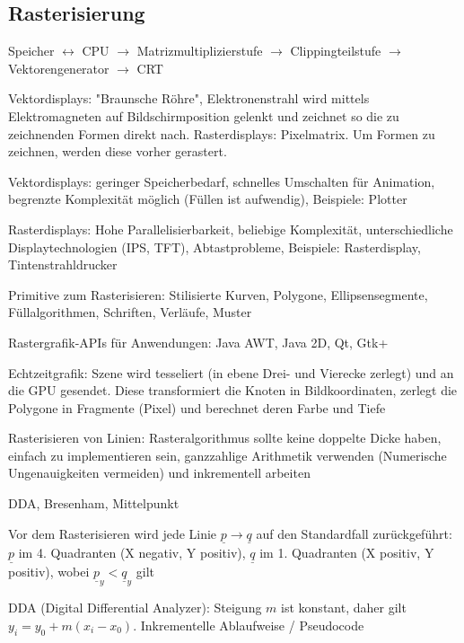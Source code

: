 \documentclass[12pt,landscape]{article}
\begin{document}
\begin{multicols}{3}
\section{Rasterisierung}
\begin{compactitem}
\item Speicher $\leftrightarrow$ CPU $\rightarrow$ Matrizmultiplizierstufe $\rightarrow$ Clippingteilstufe $\rightarrow$ Vektorengenerator $\rightarrow$ CRT
\item Vektordisplays: "Braunsche Röhre", Elektronenstrahl wird mittels Elektromagneten auf Bildschirmposition gelenkt und zeichnet so die zu zeichnenden Formen direkt nach. Rasterdisplays: Pixelmatrix. Um Formen zu zeichnen, werden diese vorher gerastert.
\item Vektordisplays: geringer Speicherbedarf, schnelles Umschalten für Animation, begrenzte Komplexität möglich (Füllen ist aufwendig), Beispiele: Plotter
\item Rasterdisplays: Hohe Parallelisierbarkeit, beliebige Komplexität, unterschiedliche Displaytechnologien (IPS, TFT), Abtastprobleme, Beispiele: Rasterdisplay, Tintenstrahldrucker
\item Primitive zum Rasterisieren: Stilisierte Kurven, Polygone, Ellipsensegmente, Füllalgorithmen, Schriften, Verläufe, Muster 
\item Rastergrafik-APIs für Anwendungen: Java AWT, Java 2D, Qt, Gtk+
\item Echtzeitgrafik: Szene wird tesseliert (in ebene Drei- und Vierecke zerlegt) und an die GPU gesendet. Diese transformiert die Knoten in Bildkoordinaten, zerlegt die Polygone in Fragmente (Pixel) und berechnet deren Farbe und Tiefe
\item Rasterisieren von Linien: Rasteralgorithmus sollte keine doppelte Dicke haben, einfach zu implementieren sein, ganzzahlige Arithmetik verwenden (Numerische Ungenauigkeiten vermeiden) und inkrementell arbeiten
\item DDA, Bresenham, Mittelpunkt
\item Vor dem Rasterisieren wird jede Linie $\underline{p} \rightarrow \underline{q}$ auf den Standardfall zurückgeführt: $\underline{p}$ im 4. Quadranten (X negativ, Y positiv), $\underline{q}$ im 1. Quadranten (X positiv, Y positiv), wobei $\underline{p}_y < \underline{q}_y$ gilt
\item DDA (Digital Differential Analyzer): Steigung $m$ ist konstant, daher gilt $y_i = y_0 + m(x_i - x_0)$. Inkrementelle Ablaufweise / Pseudocode
\begin{enumerate}

\end{enumerate}
\end{compactitem}
\end{multicols}
\end{document}
